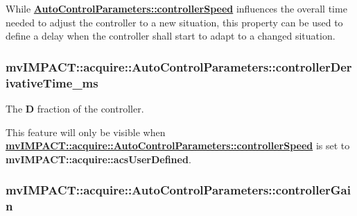 While {\bfseries \hyperlink{classmv_i_m_p_a_c_t_1_1acquire_1_1_auto_control_parameters_a61db1186975bedfc4576a68fe7213521}{Auto\+Control\+Parameters\+::controller\+Speed}} influences the overall time needed to adjust the controller to a new situation, this property can be used to define a delay when the controller shall start to adapt to a changed situation. \hypertarget{classmv_i_m_p_a_c_t_1_1acquire_1_1_auto_control_parameters_a84e0732f989407f5895f0aa199ec508f}{
\subsubsection[{controller\+Derivative\+Time\+\_\+ms}]{ mv\+I\+M\+P\+A\+C\+T\+::acquire\+::\+Auto\+Control\+Parameters\+::controller\+Derivative\+Time\+\_\+ms}}\label{classmv_i_m_p_a_c_t_1_1acquire_1_1_auto_control_parameters_a84e0732f989407f5895f0aa199ec508f}


The {\bfseries D} fraction of the controller. 

This feature will only be visible when {\bfseries \hyperlink{classmv_i_m_p_a_c_t_1_1acquire_1_1_auto_control_parameters_a61db1186975bedfc4576a68fe7213521}{mv\+I\+M\+P\+A\+C\+T\+::acquire\+::\+Auto\+Control\+Parameters\+::controller\+Speed}} is set to {\bfseries mv\+I\+M\+P\+A\+C\+T\+::acquire\+::acs\+User\+Defined}. \hypertarget{classmv_i_m_p_a_c_t_1_1acquire_1_1_auto_control_parameters_a3971197feb0538d2c231bce97390603a}{
\subsubsection[{controller\+Gain}]{ mv\+I\+M\+P\+A\+C\+T\+::acquire\+::\+Auto\+Control\+Parameters\+::controller\+Gain}}\label{classmv_i_m_p_a_c_t_1_1acquire_1_1_auto_control_parameters_a3971197feb0538d2c231bce97390603a}


